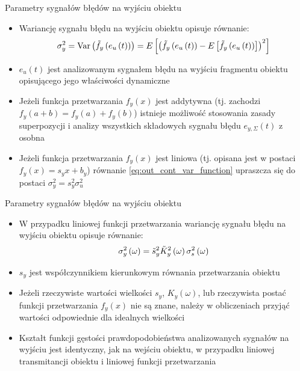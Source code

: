 \documentclass[12pt, polish, aspectratio = 169]{beamer}
\begin{document}
\begin{frame}{Parametry sygnałów błędów na wyjściu obiektu}
\begin{itemize}
\item Wariancję sygnału błędu na wyjściu obiektu opisuje równanie:
\begin{equation}
\sigma_{y}^{2} = \text{Var}\left(\tilde{f}_{y} \left(e_{u} \left(t\right)\right)\right) = E \left[ \left( \tilde{f}_{y} \left(e_{u} \left(t\right)\right) - E \left[ \tilde{f}_{y} \left(e_{u} \left(t\right)\right) \right] \right)^2 \right] \label{eq:out_cont_var_function}
\end{equation}
\item $e_{u}(t)$ jest analizowanym sygnałem błędu na wyjściu fragmentu obiektu opisującego jego właściwości dynamiczne
\item Jeżeli funkcja przetwarzania $f_{y}(x)$ jest addytywna (tj. zachodzi $f_{y}(a+b) = f_{y}(a) + f_{y}(b)$) istnieje możliwość stosowania zasady superpozycji i analizy wszystkich składowych sygnału błędu $e_{y,\Sigma}(t)$ z osobna
\item Jeżeli funkcja przetwarzania $f_{y}(x)$ jest liniowa (tj. opisana jest w postaci $f_{y}(x) = s_{y} x + b_{y}$) równanie \eqref{eq:out_cont_var_function} upraszcza się do postaci $\sigma_{y}^{2} = s_{y}^{2} \sigma_{u}^{2}$
\end{itemize}
\end{frame}

\begin{frame}{Parametry sygnałów błędów na wyjściu obiektu}
\begin{itemize}
\item W przypadku liniowej funkcji przetwarzania wariancję sygnału błędu na wyjściu obiektu opisuje równanie:
\begin{equation}
\sigma_{y}^{2} \left(\omega\right) = \tilde{s}_{y}^{2} \tilde{K}_{y}^{2} \left(\omega\right) \sigma_{s}^{2} \left(\omega\right) \label{eq:out_cont_var_omega}
\end{equation}
\item $s_{y}$ jest współczynnikiem kierunkowym równania przetwarzania obiektu
\item Jeżeli rzeczywiste wartości wielkości $s_{y}$, $K_{y}(\omega)$, lub rzeczywista postać funkcji przetwarzania $f_{y}(x)$ nie są znane, należy w obliczeniach przyjąć wartości odpowiednie dla idealnych wielkości
\item Kształt funkcji gęstości prawdopodobieństwa analizowanych sygnałów na wyjściu jest identyczny, jak na wejściu obiektu, w przypadku liniowej transmitancji obiektu i liniowej funkcji przetwarzania
\end{itemize}
\end{frame}
\end{document}
